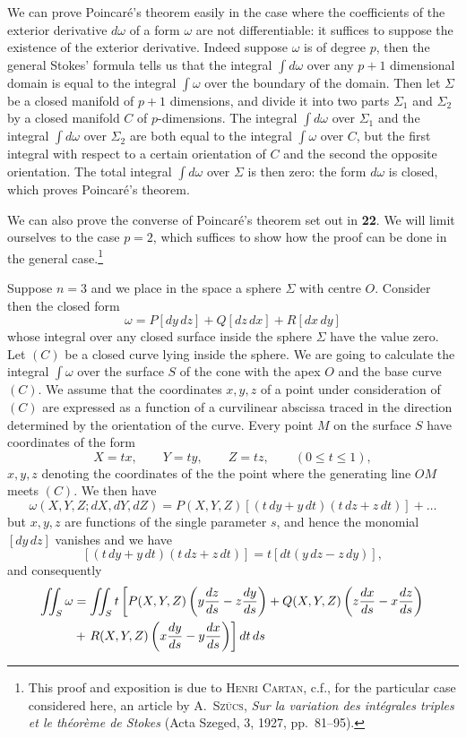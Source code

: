 \vspace{12pt}\fsec We can prove Poincar\'e's theorem easily in the case where the coefficients of the exterior derivative $d\omega$ of a form $\omega$ are not differentiable: it suffices to suppose the existence of the exterior derivative. Indeed suppose $\omega$ is of degree $p$, then the general Stokes' formula tells us that the integral $\int d\omega$ over any $p+1$ dimensional domain is equal to the integral $\int \omega$ over the boundary of the domain. Then let $\Sigma$ be a closed manifold of $p+1$ dimensions, and divide it into two parts $\Sigma_{1}$ and $\Sigma_{2}$ by a closed manifold $C$ of $p$-dimensions. The integral $\int d\omega$ over $\Sigma_{1}$ and the integral $\int d\omega$ over $\Sigma_{2}$ are both equal to the integral $\int \omega$ over $C$, but the first integral with respect to a certain orientation of $C$ and the second the opposite orientation. The total integral $\int d\omega$ over $\Sigma$ is then zero: the form $d\omega$ is closed, which proves Poincar\'e's theorem.

\vspace{12pt}\fsec We can also prove the converse of Poincar\'e's theorem set out in \textsection
\textbf{22}. We will limit ourselves to the case $p=2$, which suffices to show how the proof can be done in the general case.\footnote{This proof and exposition is due to \textsc{Henri Cartan}, {c.f.}, for the particular case considered here, an article by \textsc{A.~Sz\"ucs}, \emph{Sur la variation des int\'egrales triples et le th\'eor\`eme de Stokes} (Acta Szeged, 3, 1927, pp.~81--95).}

Suppose $n=3$ and we place in the space a sphere $\Sigma$ with centre $O$.  Consider then the closed form
\begin{equation}
  \label{eq:2.8}
  \omega=P[dy\,dz]+Q[dz\,dx]+R[dx\,dy]
\end{equation}
whose integral over any closed surface inside the sphere $\Sigma$ have the value zero. Let $(C)$ be a closed curve lying inside the sphere. We are going to calculate the integral $\int\omega$ over the surface $S$ of the cone with the apex $O$ and the base curve $(C)$. We assume that the coordinates $x,y,z$ of a point under consideration of $(C)$ are expressed as a function of a curvilinear abscissa traced in the direction determined by the orientation of the curve. Every point $M$ on the surface $S$ have coordinates of the form
\[
X=tx,\qquad Y=ty,\qquad Z=tz,\qquad(0\le t\le 1),
\]
$x,y,z$ denoting the coordinates of the the point where the generating line $OM$ meets $(C)$. We then have
\[
\omega(X,Y,Z;dX,dY,dZ)=P(X,Y,Z)[(t\,dy+y\,dt)(t\,dz+z\,dt)]+\dots
\]
but $x,y,z$ are functions of the single parameter $s$, and hence the monomial $[dy\,dz]$ vanishes and we have
\[
[(t\,dy+y\,dt)(t\,dz+z\,dt)]=t[dt(y\,dz-z\,dy)],
\]
and consequently
\begin{align}
  \label{eq:2.9}
  \iint_{S}\omega&=\iint_{S}t\left[P(X,Y,Z)\left(y\frac{dz}{ds}-z\frac{dy}{ds}\right)+Q(X,Y,Z)\left(z\frac{dx}{ds}-x\frac{dz}{ds}\right)\right.\\
&+\left.R(X,Y,Z)\left(x\frac{dy}{ds}-y\frac{dx}{ds}\right)\right]dt\,ds\notag
\end{align}

